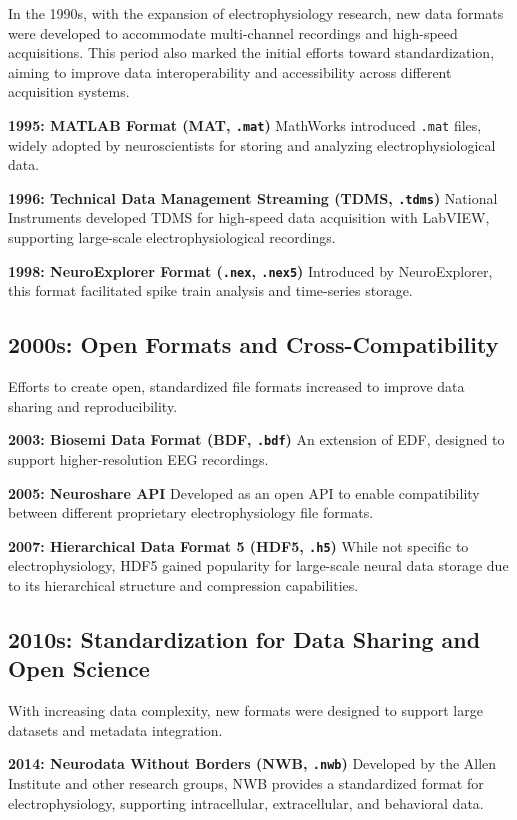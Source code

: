 \documentclass[a4paper,9pt]{extarticle}
\begin{document}
\begin{multicols}{2}
In the 1990s, with the expansion of electrophysiology research, new data formats were developed to accommodate multi-channel recordings and high-speed acquisitions. This period also marked the initial efforts toward standardization, aiming to improve data interoperability and accessibility across different acquisition systems.


\textbf{1995: MATLAB Format (MAT, \texttt{.mat})}  
MathWorks introduced \texttt{.mat} files, widely adopted by neuroscientists for storing and analyzing electrophysiological data.

\textbf{1996: Technical Data Management Streaming (TDMS, \texttt{.tdms})}  
National Instruments developed TDMS for high-speed data acquisition with LabVIEW, supporting large-scale electrophysiological recordings.

\textbf{1998: NeuroExplorer Format (\texttt{.nex}, \texttt{.nex5})}  
Introduced by NeuroExplorer, this format facilitated spike train analysis and time-series storage.

\subsection*{2000s: Open Formats and Cross-Compatibility}
Efforts to create open, standardized file formats increased to improve data sharing and reproducibility.

\textbf{2003: Biosemi Data Format (BDF, \texttt{.bdf})}  
An extension of EDF, designed to support higher-resolution EEG recordings.

\textbf{2005: Neuroshare API}  
Developed as an open API to enable compatibility between different proprietary electrophysiology file formats.

\textbf{2007: Hierarchical Data Format 5 (HDF5, \texttt{.h5})}  
While not specific to electrophysiology, HDF5 gained popularity for large-scale neural data storage due to its hierarchical structure and compression capabilities.

\subsection*{2010s: Standardization for Data Sharing and Open Science}
With increasing data complexity, new formats were designed to support large datasets and metadata integration.

\textbf{2014: Neurodata Without Borders (NWB, \texttt{.nwb})}  
Developed by the Allen Institute and other research groups, NWB provides a standardized format for electrophysiology, supporting intracellular, extracellular, and behavioral data.


\end{multicols}
\end{document}
